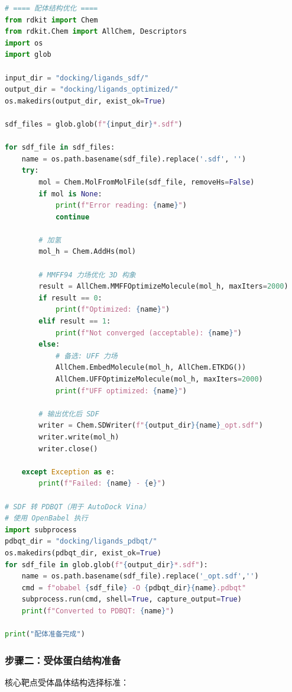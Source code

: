 \documentclass[12pt,a4paper,twoside]{article}
\begin{document}
\begin{lstlisting}[language=Python,caption={配体 3D 构象优化（RDKit）}]
# ==== 配体结构优化 ====
from rdkit import Chem
from rdkit.Chem import AllChem, Descriptors
import os
import glob

input_dir = "docking/ligands_sdf/"
output_dir = "docking/ligands_optimized/"
os.makedirs(output_dir, exist_ok=True)

sdf_files = glob.glob(f"{input_dir}*.sdf")

for sdf_file in sdf_files:
    name = os.path.basename(sdf_file).replace('.sdf', '')
    try:
        mol = Chem.MolFromMolFile(sdf_file, removeHs=False)
        if mol is None:
            print(f"Error reading: {name}")
            continue

        # 加氢
        mol_h = Chem.AddHs(mol)

        # MMFF94 力场优化 3D 构象
        result = AllChem.MMFFOptimizeMolecule(mol_h, maxIters=2000)
        if result == 0:
            print(f"Optimized: {name}")
        elif result == 1:
            print(f"Not converged (acceptable): {name}")
        else:
            # 备选: UFF 力场
            AllChem.EmbedMolecule(mol_h, AllChem.ETKDG())
            AllChem.UFFOptimizeMolecule(mol_h, maxIters=2000)
            print(f"UFF optimized: {name}")

        # 输出优化后 SDF
        writer = Chem.SDWriter(f"{output_dir}{name}_opt.sdf")
        writer.write(mol_h)
        writer.close()

    except Exception as e:
        print(f"Failed: {name} - {e}")

# SDF 转 PDBQT（用于 AutoDock Vina）
# 使用 OpenBabel 执行
import subprocess
pdbqt_dir = "docking/ligands_pdbqt/"
os.makedirs(pdbqt_dir, exist_ok=True)
for sdf_file in glob.glob(f"{output_dir}*.sdf"):
    name = os.path.basename(sdf_file).replace('_opt.sdf','')
    cmd = f"obabel {sdf_file} -O {pdbqt_dir}{name}.pdbqt"
    subprocess.run(cmd, shell=True, capture_output=True)
    print(f"Converted to PDBQT: {name}")

print("配体准备完成")
\end{lstlisting}

\subsubsection{步骤二：受体蛋白结构准备}

核心靶点受体晶体结构选择标准：
\end{document}
